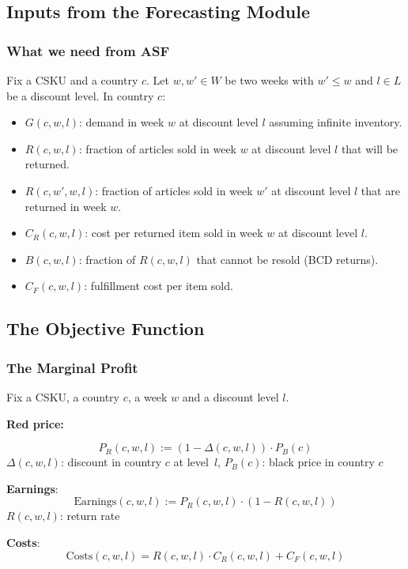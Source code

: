 \documentclass[xcolor=table]{beamer}
\begin{document}
\subsection{Inputs from the Forecasting Module}
\begin{frame}[t]
  \frametitle{What we need from ASF}
    Fix a CSKU and a country $c$. Let $w, w' \in W$ be two weeks with $w' \leq w$ and $l \in L$
    be a discount level. In country $c$: 
    \begin{itemize}
    \item $G(c, w, l)$: demand in week $w$ at discount level $l$ assuming
        infinite inventory.
    \item $R(c, w, l)$: fraction of articles sold in week $w$ at discount level $l$
        that will be returned.
      \item $R(c, w', w, l)$: fraction of articles sold in week $w'$ at discount
        level $l$ that are returned in week $w$. 
      \item $C_R(c, w, l)$: cost per returned item sold in week $w$ at discount level $l$.
      \item $B(c, w, l)$: fraction of $R(c, w, l)$ that cannot be resold (BCD
        returns).
      \item $C_F(c, w, l)$: fulfillment cost per item sold.
        \end{itemize}
\end{frame}

\subsection{The Objective Function}

\begin{frame}[t]
\frametitle{The Marginal Profit}
Fix a CSKU, a country $c$, a week $w$ and a discount level $l$.

\bigskip

\textcolor{orange2}{\textbf{Red price:}}
  
  \[P_R(c, w, l) := (1 - \Delta(c, w, l)) \cdot P_B(c)\]
  $\Delta(c, w, l)$: discount in country $c$ at level~$l$, $P_B(c)$: black price in country $c$

\bigskip

\textcolor{orange2}{\textbf{Earnings}}:
  \[\text{Earnings}(c, w, l) := P_R(c, w, l) \cdot (1 - R(c, w, l))\]
  $R(c, w, l)$: return rate

\bigskip

\textcolor{orange2}{\textbf{Costs}}:
  \[
    \text{Costs}(c, w, l) = R(c, w, l) \cdot C_R(c, w, l) + C_F(c, w, l)
  \]
\end{frame}
\end{document}
